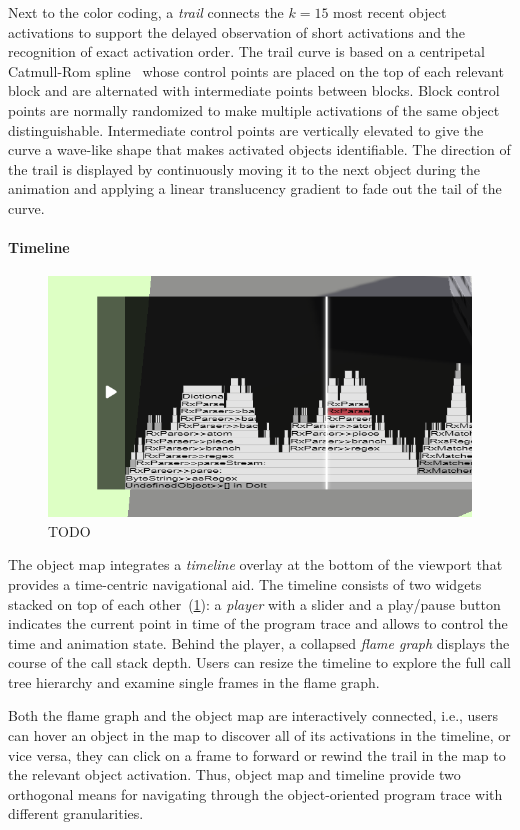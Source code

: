 Next to the color coding, a \emph{trail} connects the $k = 15$ most recent object activations to support the delayed observation of short activations and the recognition of exact activation order.
The trail curve is based on a centripetal Catmull-Rom spline~\cite{catmull1974class} whose control points are placed on the top of each relevant block and are alternated with intermediate points between blocks.
Block control points are normally randomized to make multiple activations of the same object distinguishable.
Intermediate control points are vertically elevated to give the curve a wave-like shape that makes activated objects identifiable.
The direction of the trail is displayed by continuously moving it to the next object during the animation and applying a linear translucency gradient to fade out the tail of the curve.

\paragraph{Timeline}
\label{sec:visualization_approach/mapping/timeline}

\begin{figure}
	\includegraphics[width=\linewidth]{sections/03_visualization_approach/mapping/timeline}
	\caption{TODO}
	\label{fig:visualization_approach/mapping/timeline}
\end{figure}

The object map integrates a \emph{timeline} overlay at the bottom of the viewport that provides a time-centric navigational aid.
The timeline consists of two widgets stacked on top of each other~(\cref{fig:visualization_approach/mapping/timeline}):
a \emph{player} with a slider and a play/pause button indicates the current point in time of the program trace and allows to control the time and animation state.
Behind the player, a collapsed \emph{flame graph} displays the course of the call stack depth.
Users can resize the timeline to explore the full call tree hierarchy and examine single frames in the flame graph.

Both the flame graph and the object map are interactively connected, i.e., users can hover an object in the map to discover all of its activations in the timeline, or vice versa, they can click on a frame to forward or rewind the trail in the map to the relevant object activation.
Thus, object map and timeline provide two orthogonal means for navigating through the object-oriented program trace with different granularities.
